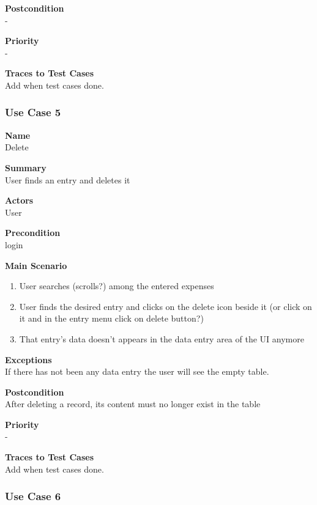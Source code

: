 \documentclass[12pt]{article}
\begin{document}
\noindent
{\bf Postcondition}\\
-

\noindent
{\bf Priority}\\
-

\noindent
{\bf Traces to Test Cases}\\
Add when test cases done.


\subsubsection{Use Case 5} \label{uc:1}		%

\noindent
{\bf Name}\\
Delete

\noindent
{\bf Summary}\\
User finds an entry and deletes it

\noindent
{\bf Actors}\\
User

\noindent
{\bf Precondition}\\
login

\noindent
{\bf Main Scenario}\\
\vspace*{-0.2in}
\begin{enumerate}
\item User searches (scrolls?)  among the entered expenses
\item User finds the desired entry and clicks on the delete icon beside it (or click on it and in the entry menu click on delete button?)
\item That entry’s data doesn’t appears in the data entry area of the UI anymore


\end{enumerate}

\noindent
{\bf Exceptions}\\
If there has not been any data entry the user will see the empty table.

\noindent
{\bf Postcondition}\\
After deleting a record, its content must no longer exist in the table

\noindent
{\bf Priority}\\
-

\noindent
{\bf Traces to Test Cases}\\
Add when test cases done.
 

\subsubsection{Use Case 6} \label{uc:1}		%
\end{document}
